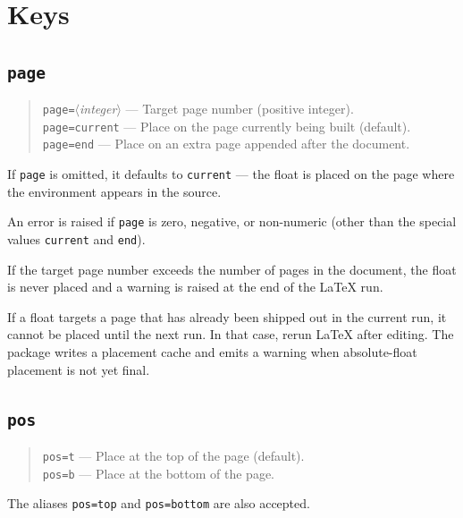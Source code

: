 \documentclass[a4paper]{article}
\newcommand\key[1]{\textcolor{keycolor}{\texttt{#1}}}
\newcommand\meta[1]{\ensuremath{\langle}\textit{#1}\ensuremath{\rangle}}
\newenvironment{warningblock}
  {\list{}{}%
   \item[{\sffamily\bfseries\color{notes}WARNING}]\ignorespaces}
  {\endlist}
\begin{document}
\section{Keys}

\subsection{\key{page}}

\begin{quote}
\key{page=}\meta{integer} --- Target page number (positive integer).\\
\key{page=current} --- Place on the page currently being built (default).\\
\key{page=end} --- Place on an extra page appended after the document.
\end{quote}

If \key{page} is omitted, it defaults to \key{current} --- the float
is placed on the page where the environment appears in the source.

An error is raised if \key{page} is zero, negative, or non-numeric
(other than the special values \key{current} and \key{end}).

If the target page number exceeds the number of pages in the document,
the float is never placed and a warning is raised at the end of the
\LaTeX{} run.

\begin{warningblock}
  If a float targets a page that has already been shipped out in the
  current run, it cannot be placed until the next run. In that case,
  rerun \LaTeX{} after editing. The package writes a placement cache
  and emits a warning when absolute-float placement is not yet final.
\end{warningblock}

\subsection{\key{pos}}

\begin{quote}
\key{pos=t} --- Place at the top of the page (default).\\
\key{pos=b} --- Place at the bottom of the page.
\end{quote}

The aliases \key{pos=top} and \key{pos=bottom} are also accepted.
\end{document}
